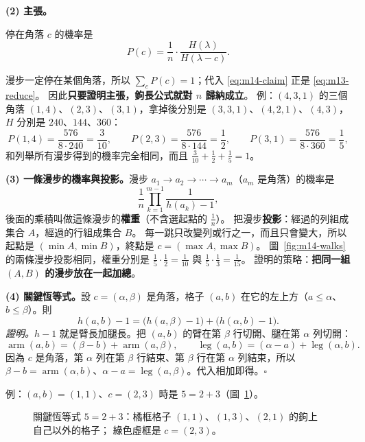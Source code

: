 \textbf{(2) 主張。}
\begin{thmbox}[主張]
停在角落 $c$ 的機率是
\begin{equation}\label{eq:m14-claim}
P(c)=\frac{1}{n}\cdot\frac{H(\lambda)}{H(\lambda-c)} .
\end{equation}
\end{thmbox}
漫步一定停在某個角落，所以 $\sum_c P(c)=1$；代入 \eqref{eq:m14-claim} 正是 \eqref{eq:m13-reduce}。
因此\textbf{只要證明主張，鉤長公式就對 $n$ 歸納成立}。
例：$(4,3,1)$ 的三個角落 $(1,4)$、$(2,3)$、$(3,1)$，拿掉後分別是 $(3,3,1)$、$(4,2,1)$、$(4,3)$，
$H$ 分別是 $240$、$144$、$360$：
\[
P(1,4)=\frac{576}{8\cdot240}=\frac{3}{10},\qquad
P(2,3)=\frac{576}{8\cdot144}=\frac12,\qquad
P(3,1)=\frac{576}{8\cdot360}=\frac15 ,
\]
和列舉所有漫步得到的機率完全相同，而且 $\frac{3}{10}+\frac12+\frac15=1$。

\textbf{(3) 一條漫步的機率與投影。}漫步 $a_1\to a_2\to\cdots\to a_m$（$a_m$ 是角落）的機率是
\[
\frac1n\prod_{k=1}^{m-1}\frac{1}{h(a_k)-1} ,
\]
後面的乘積叫做這條漫步的\textbf{權重}（不含選起點的 $\frac1n$）。
把漫步\textbf{投影}：經過的列組成集合 $A$，經過的行組成集合 $B$。
每一跳只改變列或行之一，而且只會變大，所以起點是 $(\min A,\min B)$，終點是 $c=(\max A,\max B)$。
圖~\ref{fig:m14-walks} 的兩條漫步投影相同，權重分別是 $\frac15\cdot\frac12=\frac1{10}$ 與 $\frac15\cdot\frac13=\frac1{15}$。
證明的策略：\textbf{把同一組 $(A,B)$ 的漫步放在一起加總}。

\textbf{(4) 關鍵恆等式。}設 $c=(\alpha,\beta)$ 是角落，格子 $(a,b)$ 在它的左上方（$a\le\alpha$、$b\le\beta$）。則
\begin{equation}\label{eq:m14-identity}
h(a,b)-1=\bigl(h(a,\beta)-1\bigr)+\bigl(h(\alpha,b)-1\bigr).
\end{equation}
\textit{證明。}$h-1$ 就是臂長加腿長。把 $(a,b)$ 的臂在第 $\beta$ 行切開、腿在第 $\alpha$ 列切開：
\[
\operatorname{arm}(a,b)=(\beta-b)+\operatorname{arm}(a,\beta),\qquad
\operatorname{leg}(a,b)=(\alpha-a)+\operatorname{leg}(\alpha,b).
\]
因為 $c$ 是角落，第 $\alpha$ 列在第 $\beta$ 行結束、第 $\beta$ 行在第 $\alpha$ 列結束，所以
$\beta-b=\operatorname{arm}(\alpha,b)$、$\alpha-a=\operatorname{leg}(a,\beta)$。代入相加即得。$\square$

例：$(a,b)=(1,1)$、$c=(2,3)$ 時是 $5=2+3$（圖~\ref{fig:m14-identity}）。

\begin{figure}[H]
\centering
\FigMXIVIdentity
\caption{關鍵恆等式 $5=2+3$：\textcolor{cTop}{橘框}格子 $(1,1)$、$(1,3)$、$(2,1)$ 的鉤上自己以外的格子；
\textcolor{cC}{綠色虛框}是 $c=(2,3)$。}
\label{fig:m14-identity}
\end{figure}


